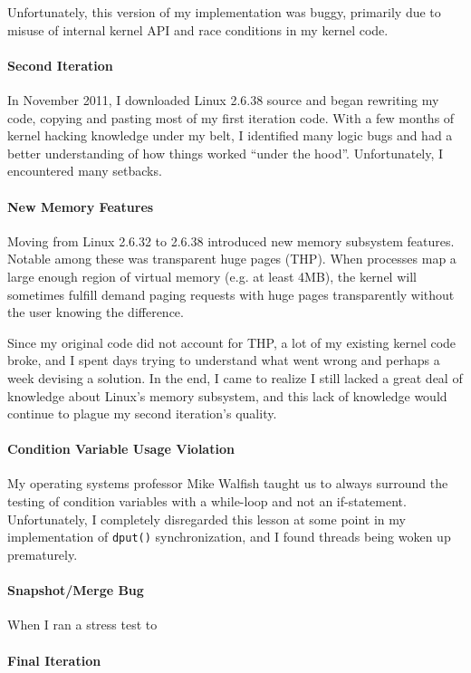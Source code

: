 Unfortunately, this version of my implementation was buggy, primarily due to
misuse of internal kernel API and race conditions in my kernel code.

\paragraph{Second Iteration}
In November 2011, I downloaded Linux 2.6.38 source and began rewriting my code,
copying and pasting most of my first iteration code. With a few months of kernel
hacking knowledge under my belt, I identified many logic bugs and had a better
understanding of how things worked ``under the hood''. Unfortunately, I
encountered many setbacks.

\paragraph{New Memory Features}
Moving from Linux 2.6.32 to 2.6.38 introduced new memory subsystem features.
Notable among these was transparent huge pages (THP). When processes map a large
enough region of virtual memory (e.g. at least 4MB), the kernel will sometimes
fulfill demand paging requests with huge pages transparently without the user
knowing the difference.

Since my original code did not account for THP, a lot of my existing kernel code
broke, and I spent days trying to understand what went wrong and perhaps a week
devising a solution. In the end, I came to realize I still lacked a great deal
of knowledge about Linux's memory subsystem, and this lack of knowledge would
continue to plague my second iteration's quality.

\paragraph{Condition Variable Usage Violation}
My operating systems professor Mike Walfish taught us to always surround
the testing of condition variables with a while-loop and not an if-statement.
Unfortunately, I completely disregarded this lesson at some point in my
implementation of {\tt dput()} synchronization, and I found threads being
woken up prematurely.

\paragraph{Snapshot/Merge Bug}
When I ran a stress test to 

\paragraph{Final Iteration}


\endinput

